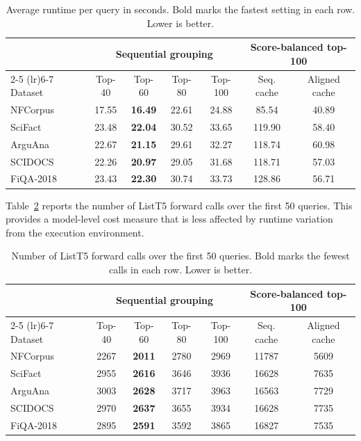 \begin{table}[t]
  \centering
  \begin{tabular}{lcccccc}
    \toprule
    & \multicolumn{4}{c}{Sequential grouping} & \multicolumn{2}{c}{Score-balanced top-100} \\
    \cmidrule(lr){2-5} \cmidrule(lr){6-7}
    Dataset & Top-40 & Top-60 & Top-80 & Top-100 & Seq. cache & Aligned cache \\
    \midrule
    NFCorpus & 17.55 & \textbf{16.49} & 22.61 & 24.88 & 85.54 & 40.89 \\
    SciFact & 23.48 & \textbf{22.04} & 30.52 & 33.65 & 119.90 & 58.40 \\
    ArguAna & 22.67 & \textbf{21.15} & 29.61 & 32.27 & 118.74 & 60.98 \\
    SCIDOCS & 22.26 & \textbf{20.97} & 29.05 & 31.68 & 118.71 & 57.03 \\
    FiQA-2018 & 23.43 & \textbf{22.30} & 30.74 & 33.73 & 128.86 & 56.71 \\
    \bottomrule
  \end{tabular}
  \caption{Average runtime per query in seconds. Bold marks the fastest setting in each row. Lower is better.}
  \label{tab:runtime-results}
\end{table}

Table~\ref{tab:forward-results} reports the number of ListT5 forward calls over the first 50 queries. This provides a model-level cost measure that is less affected by runtime variation from the execution environment.

\begin{table}[t]
  \centering
  \begin{tabular}{lcccccc}
    \toprule
    & \multicolumn{4}{c}{Sequential grouping} & \multicolumn{2}{c}{Score-balanced top-100} \\
    \cmidrule(lr){2-5} \cmidrule(lr){6-7}
    Dataset & Top-40 & Top-60 & Top-80 & Top-100 & Seq. cache & Aligned cache \\
    \midrule
    NFCorpus & 2267 & \textbf{2011} & 2780 & 2969 & 11787 & 5609 \\
    SciFact & 2955 & \textbf{2616} & 3646 & 3936 & 16628 & 7635 \\
    ArguAna & 3003 & \textbf{2628} & 3717 & 3963 & 16563 & 7729 \\
    SCIDOCS & 2970 & \textbf{2637} & 3655 & 3934 & 16628 & 7735 \\
    FiQA-2018 & 2895 & \textbf{2591} & 3592 & 3865 & 16827 & 7535 \\
    \bottomrule
  \end{tabular}
  \caption{Number of ListT5 forward calls over the first 50 queries. Bold marks the fewest calls in each row. Lower is better.}
  \label{tab:forward-results}
\end{table}